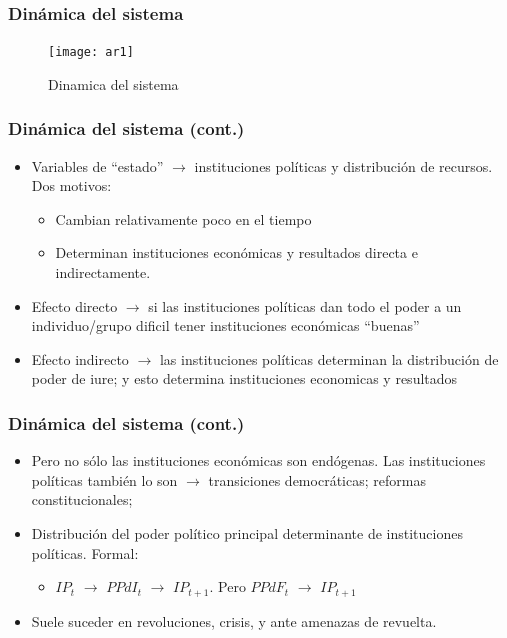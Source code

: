 \documentclass[handout,final,xcolor=dvipsnames]{beamer}
\begin{document}
\begin{frame}\frametitle{Dinámica del sistema}
  \begin{figure}[htbp]
    \centering \vspace{-3cm}
    \texttt{[image: ar1]}
    \caption{Dinamica del sistema}
    \label{fig:ar1}
  \end{figure}
\end{frame}


\begin{frame}\frametitle{Dinámica del sistema (cont.)}
\begin{itemize}\itemsep 15pt
\item Variables de ``estado'' $\longrightarrow$ instituciones
  políticas y distribución de recursos. Dos motivos:
\begin{itemize}\itemsep 15pt \medskip 
\item Cambian relativamente poco en el tiempo
\item Determinan instituciones económicas y resultados directa e
  indirectamente. 
\end{itemize} 
\item Efecto directo $\longrightarrow$ si las instituciones políticas
  dan todo el poder a un individuo/grupo dificil tener instituciones
  económicas ``buenas''
\item Efecto indirecto $\longrightarrow$ las instituciones políticas
  determinan la distribución de poder de iure; y esto determina
  instituciones economicas y resultados
\end{itemize}
\end{frame}



\begin{frame}\frametitle{Dinámica del sistema (cont.)}
\begin{itemize}\itemsep 15pt
\item Pero no sólo las instituciones económicas son endógenas. Las
  instituciones políticas también lo son $\longrightarrow$
  transiciones democráticas; reformas constitucionales;
\item Distribución del poder político principal determinante de
  instituciones políticas. Formal:
\begin{itemize}\itemsep 15pt \medskip 
\item $IP_{t}$ $\longrightarrow$ $PPdI_{t}$ $\longrightarrow$
  $IP_{t+1}$. Pero $PPdF_{t}$ $\longrightarrow$ $IP_{t+1}$
\end{itemize} 
\item Suele suceder en revoluciones, crisis, y ante amenazas de
  revuelta. 
\end{itemize}
\end{frame}
\end{document}
